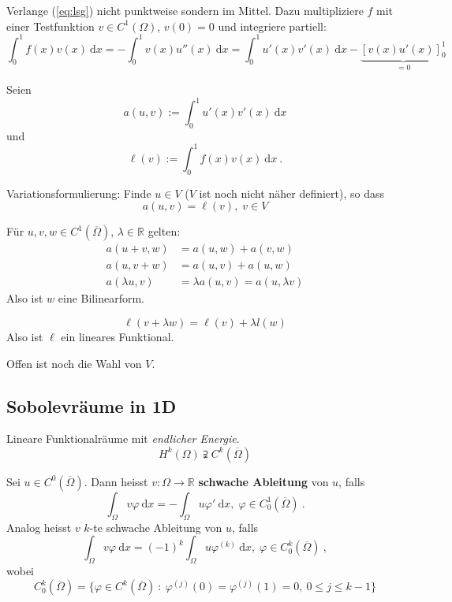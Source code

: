 \begin{idee}
Verlange (\ref{eq:lsg}) nicht punktweise sondern im Mittel. Dazu multipliziere 
$f$ mit einer Testfunktion $v \in C^1(\Omega)$, $v(0) = 0$ und integriere
partiell:
\[
\int_0^1 f(x) v(x) \ \mathrm dx = - \int_0^1 v(x) u''(x) \ \mathrm dx
    = \int_0^1 u'(x) v'(x) \ \mathrm dx - \underbrace{ \left[v(x) u'(x) \right]_0^1}_{=0}
\]
\end{idee}

Seien
\[
a(u,v) := \int_0^1 u'(x) v'(x) \ \mathrm dx
\]
und
\[
\ell(v) := \int_0^1 f(x) v(x) \ \mathrm dx \ .
\]

Variationsformulierung: Finde $u \in V$ ($V$ ist noch nicht näher definiert), so dass
\[
a(u,v) = \ell(v), \; v \in V
\]

Für $u, v, w \in C^1(\overline \Omega)$, $\lambda \in \mathbb R$ gelten:
\begin{align*}
a(u+v, w) &= a(u,w) + a(v,w) \\
a(u, v+w) &= a(u,v) + a(u,w) \\
a(\lambda u, v) &= \lambda a(u,v) = a(u, \lambda v)
\end{align*}
Also ist $w$ eine Bilinearform.

\[
\ell(v + \lambda w) = \ell(v) + \lambda l(w)
\]
Also ist $\ell$ ein lineares Funktional.

Offen ist noch die Wahl von $V$.

\subsection{Sobolevräume in 1D}
\begin{idee}
Lineare Funktionalräume mit \textit{endlicher Energie}.
\[
H^k(\Omega) \supsetneqq C^k(\overline \Omega)
\]
\end{idee}

\begin{defi}
Sei $u \in C^0(\overline \Omega)$. Dann heisst $v: \Omega \to \mathbb R$ \textbf{schwache Ableitung} 
von $u$, falls
\[
\int_\Omega v \varphi \ \mathrm dx = - \int_\Omega u \varphi' \ \mathrm dx, \; \varphi \in C_0^1(\overline \Omega) \ .
\]
Analog heisst $v$ $k$-te schwache Ableitung von $u$, falls
\[
\int_\Omega v \varphi \ \mathrm dx = (-1)^k \int_\Omega u \varphi^{(k)} \ \mathrm dx, 
    \; \varphi \in C_0^k(\overline \Omega) \ ,
\]
wobei
\[
C_0^k(\overline \Omega) = \{ \varphi \in C^k(\overline \Omega) \ : \ 
    \varphi^{(j)}(0) = \varphi^{(j)}(1) = 0, \ 0 \leq j \leq k-1 \}
\]
\end{defi}

